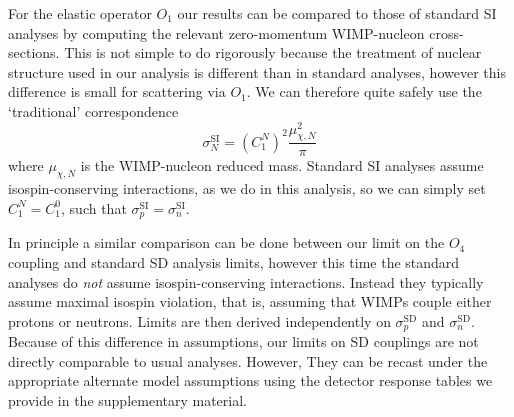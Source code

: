 For the elastic operator $O_1$ our results can be compared to those of standard SI analyses by computing the relevant zero-momentum WIMP-nucleon cross-sections. This is not simple to do rigorously because the treatment of nuclear structure used in our analysis is different than in standard analyses, however this difference is small for scattering via $O_1$. We can therefore quite safely use the `traditional' correspondence~\cite{DeSimone:2016fbz}
%
\begin{equation}
\sigma_{N}^\mathrm{SI} = \left(C^N_1\right)^2 \frac{\mu_{\chi,N}^2}{\pi}
\end{equation}
%
where $\mu_{\chi,N}$ is the WIMP-nucleon reduced mass. Standard SI analyses assume isospin-conserving interactions, as we do in this analysis, so we can simply set $C^N_1 = C^0_1$, such that $\sigma_{p}^\mathrm{SI}=\sigma_{n}^\mathrm{SI}$. 

In principle a similar comparison can be done between our limit on the $O_4$ coupling and standard SD analysis limits, however this time the standard analyses do {\em not} assume isospin-conserving interactions. Instead they typically assume maximal isospin violation, that is, assuming that WIMPs couple either protons or neutrons. Limits are then derived independently on $\sigma_{p}^\mathrm{SD}$ and $\sigma_{n}^\mathrm{SD}$. Because of this difference in assumptions, our limits on SD couplings are not directly comparable to usual analyses. However, They can be recast under the appropriate alternate model assumptions using the detector response tables we provide in the supplementary material.
 








